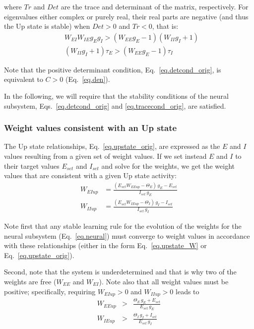 \documentclass[twocolumn]{article}
\newcommand{\EE}{\mathit{EE}}
\newcommand{\EI}{\mathit{EI}}
\newcommand{\IE}{\mathit{IE}}
\newcommand{\II}{\mathit{II}}
\newcommand{\set}{\mathit{set}}
\newcommand{\up}{\mathit{up}}
\newcommand{\De}{\mathit{Det}}
\newcommand{\Tr}{\mathit{Tr}}
\begin{document}
\noindent where $\Tr$ and $\De$ are the trace and determinant of the matrix, respectively. For eigenvalues either complex or purely real, their real parts are negative (and thus the Up state is stable) when $\De>0$ and $\Tr<0$, that is:
\begin{eqnarray}
& W_{\EI} W_{\IE} g_E g_I > (W_{\EE} g_E - 1)(W_{\II} g_I + 1) \label{eq.detcond_orig}\\
& (W_{\II} g_I + 1)\tau_E > (W_{\EE} g_E - 1)\tau_I
\label{eq.tracecond_orig}
\end{eqnarray}

\noindent Note that the positive determinant condition, Eq.\ \ref{eq.detcond_orig}, is equivalent to $C>0$ (Eq.\ \ref{eq.den}).

In the following, we will require that the stability conditions of the neural subsystem, Eqs.\ \ref{eq.detcond_orig} and \ref{eq.tracecond_orig}, are satisfied.



\subsubsection{Weight values consistent with an Up state}

The Up state relationships, Eq.\ \ref{eq.upstate_orig}, are expressed as the $E$ and $I$ values resulting from a given set of weight values. If we set instead $E$ and $I$ to their target values $E_{\set}$ and $I_{\set}$ and solve for the weights, we get the weight values that are consistent with a given Up state activity:
\begin{equation}
\begin{aligned}
W_{\EI\up} & = \frac{(E_{\set} W_{\EE\up} - \Theta_E) \, g_E - E_{\set}}{I_{\set} \, g_E} \\
W_{\II\up} & = \frac{(E_{\set} W_{\IE\up} - \Theta_I) \, g_I - I_{\set}}{I_{\set} \, g_I}
\end{aligned}
\label{eq.upstate_W}
\end{equation}

\noindent Note first that any stable learning rule for the evolution of the weights for the neural subsystem (Eq.\ \ref{eq.neural}) must converge to weight values in accordance with these relationships (either in the form Eq.\ \ref{eq.upstate_W} or Eq.\ \ref{eq.upstate_orig}).

Second, note that the system is underdetermined and that is why two of the weights are free ($W_{\EE}$ and $W_{\EI}$). Note also that all weight values must be positive; specifically, requiring $W_{\EI\up}>0$ and $W_{\II\up}>0$ leads to
\begin{eqnarray}
W_{\EE\up} & > & \frac{\Theta_E \, g_E + E_{\set}}{E_{\set} \, g_E}
\label{eq.positive_WEI} \\
W_{\IE\up} & > & \frac{\Theta_I \, g_I + I_{\set}}{E_{\set} \, g_I}
\label{eq.positive_WII}
\end{eqnarray}
\end{document}
